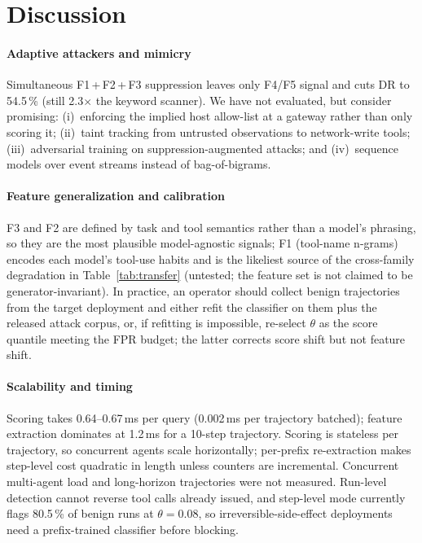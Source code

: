 \documentclass[conference]{IEEEtran}
\begin{document}
\section{Discussion}
\label{sec:discussion}

\paragraph{Adaptive attackers and mimicry}
Simultaneous F1\,+\,F2\,+\,F3 suppression leaves only F4/F5 signal and
cuts DR to 54.5\,\% (still 2.3$\times$ the keyword scanner).  We have
not evaluated, but consider promising: (i)~enforcing the implied host
allow-list at a gateway rather than only scoring it; (ii)~taint
tracking from untrusted observations to network-write tools;
(iii)~adversarial training on suppression-augmented attacks; and
(iv)~sequence models over event streams instead of bag-of-bigrams.

\paragraph{Feature generalization and calibration}
F3 and F2 are defined by task and tool semantics rather than a model's
phrasing, so they are the most plausible model-agnostic signals; F1
(tool-name n-grams) encodes each model's tool-use habits and is the
likeliest source of the cross-family degradation in
Table~\ref{tab:transfer} (untested; the feature set is not claimed to
be generator-invariant).  In practice, an operator should collect
benign trajectories from the target deployment and either refit the
classifier on them plus the released attack corpus, or, if refitting is
impossible, re-select $\theta$ as the score quantile meeting the FPR
budget; the latter corrects score shift but not feature shift.

\paragraph{Scalability and timing}
Scoring takes 0.64--0.67\,ms per query (0.002\,ms per trajectory
batched); feature extraction dominates at 1.2\,ms for a 10-step
trajectory.  Scoring is stateless per trajectory, so concurrent agents
scale horizontally; per-prefix re-extraction makes step-level cost
quadratic in length unless counters are incremental.  Concurrent
multi-agent load and long-horizon trajectories were not measured.
Run-level detection cannot reverse tool calls already issued, and
step-level mode currently flags 80.5\,\% of benign runs at
$\theta{=}0.08$, so irreversible-side-effect deployments need a
prefix-trained classifier before blocking.
\end{document}
